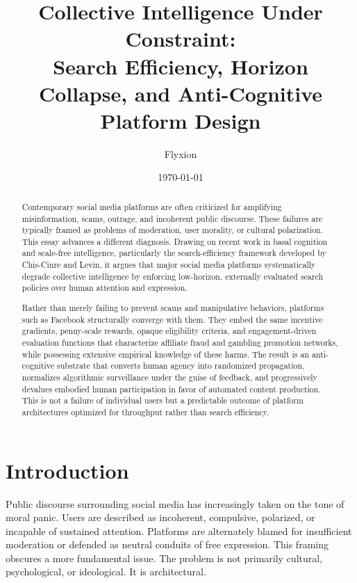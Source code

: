 \documentclass[12pt]{article}
\title{\textbf{Collective Intelligence Under Constraint:\\
Search Efficiency, Horizon Collapse, and Anti-Cognitive Platform Design}}
\author{Flyxion}
\date{\today}
\begin{document}
\maketitle

\begin{abstract}

Contemporary social media platforms are often criticized for amplifying misinformation, scams, outrage, and incoherent public discourse. These failures are typically framed as problems of moderation, user morality, or cultural polarization. This essay advances a different diagnosis. Drawing on recent work in basal cognition and scale-free intelligence, particularly the search-efficiency framework developed by Chis-Ciure and Levin, it argues that major social media platforms systematically degrade collective intelligence by enforcing low-horizon, externally evaluated search policies over human attention and expression. 

Rather than merely failing to prevent scams and manipulative behaviors, platforms such as Facebook structurally converge with them. They embed the same incentive gradients, penny-scale rewards, opaque eligibility criteria, and engagement-driven evaluation functions that characterize affiliate fraud and gambling promotion networks, while possessing extensive empirical knowledge of these harms. The result is an anti-cognitive substrate that converts human agency into randomized propagation, normalizes algorithmic surveillance under the guise of feedback, and progressively devalues embodied human participation in favor of automated content production. This is not a failure of individual users but a predictable outcome of platform architectures optimized for throughput rather than search efficiency.

\end{abstract}

\newpage
\section{Introduction}

Public discourse surrounding social media has increasingly taken on the tone of moral panic. Users are described as incoherent, compulsive, polarized, or incapable of sustained attention. Platforms are alternately blamed for insufficient moderation or defended as neutral conduits of free expression. This framing obscures a more fundamental issue. The problem is not primarily cultural, psychological, or ideological. It is architectural.
\end{document}
